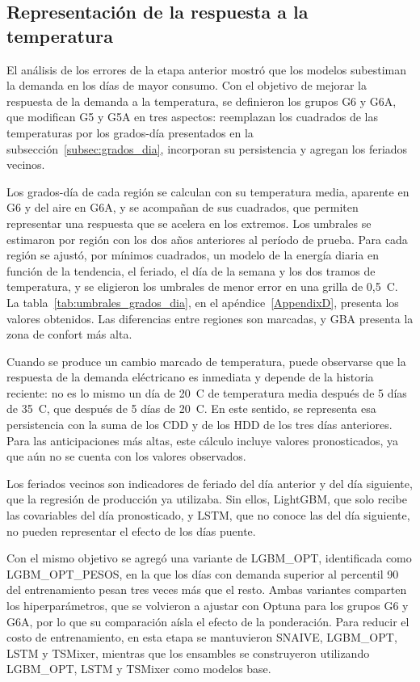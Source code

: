 \subsection{Representación de la respuesta a la temperatura}
\label{subsec:respuesta_temperatura}

El análisis de los errores de la etapa anterior mostró que los modelos subestiman la demanda en los días de mayor consumo. Con el objetivo de mejorar la respuesta de la demanda a la temperatura, se definieron los grupos G6 y G6A, que modifican G5 y G5A en tres aspectos: reemplazan los cuadrados de las temperaturas por los grados-día presentados en la subsección~\ref{subsec:grados_dia}, incorporan su persistencia y agregan los feriados vecinos.

Los grados-día de cada región se calculan con su temperatura media, aparente en G6 y del aire en G6A, y se acompañan de sus cuadrados, que permiten representar una respuesta que se acelera en los extremos. Los umbrales se estimaron por región con los dos años anteriores al período de prueba. Para cada región se ajustó, por mínimos cuadrados, un modelo de la energía diaria en función de la tendencia, el feriado, el día de la semana y los dos tramos de temperatura, y se eligieron los umbrales de menor error en una grilla de 0,5~\textdegree C. La tabla~\ref{tab:umbrales_grados_dia}, en el apéndice~\ref{AppendixD}, presenta los valores obtenidos. Las diferencias entre regiones son marcadas, y GBA presenta la zona de confort más alta.

Cuando se produce un cambio marcado de temperatura, puede observarse que la respuesta de la demanda eléctricano es inmediata y depende de la historia reciente: no es lo mismo un día de 20~\textdegree C de temperatura media después de 5 días de 35~\textdegree C, que después de 5 días de 20~\textdegree C. En este sentido, se representa esa persistencia con la suma de los CDD y de los HDD de los tres días anteriores. Para las anticipaciones más altas, este cálculo incluye valores pronosticados, ya que aún no se cuenta con los valores observados.

Los feriados vecinos son indicadores de feriado del día anterior y del día siguiente, que la regresión de producción ya utilizaba. Sin ellos, LightGBM, que solo recibe las covariables del día pronosticado, y LSTM, que no conoce las del día siguiente, no pueden representar el efecto de los días puente.

Con el mismo objetivo se agregó una variante de LGBM\_OPT, identificada como LGBM\_OPT\_PESOS, en la que los días con demanda superior al percentil 90 del entrenamiento pesan tres veces más que el resto. Ambas variantes comparten los hiperparámetros, que se volvieron a ajustar con Optuna para los grupos G6 y G6A, por lo que su comparación aísla el efecto de la ponderación. Para reducir el costo de entrenamiento, en esta etapa se mantuvieron SNAIVE, LGBM\_OPT, LSTM y TSMixer, mientras que los ensambles se construyeron utilizando LGBM\_OPT, LSTM y TSMixer como modelos base.

